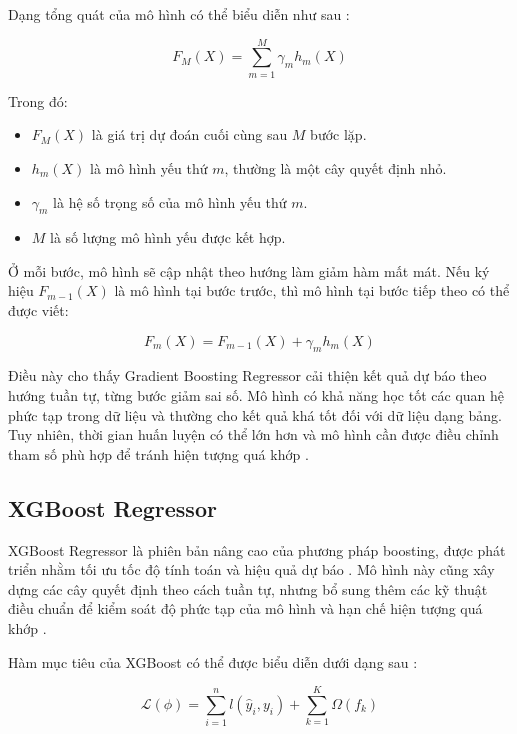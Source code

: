 Dạng tổng quát của mô hình có thể biểu diễn như sau \cite{sklearn_gbr,esl}:

\begin{equation}
F_M(X) = \sum_{m=1}^{M} \gamma_m h_m(X)
\label{eq:gbr1}
\end{equation}

Trong đó:
\begin{itemize}
    \item \(F_M(X)\) là giá trị dự đoán cuối cùng sau \(M\) bước lặp.
    \item \(h_m(X)\) là mô hình yếu thứ \(m\), thường là một cây quyết định nhỏ.
    \item \(\gamma_m\) là hệ số trọng số của mô hình yếu thứ \(m\).
    \item \(M\) là số lượng mô hình yếu được kết hợp.
\end{itemize}

Ở mỗi bước, mô hình sẽ cập nhật theo hướng làm giảm hàm mất mát. Nếu ký hiệu \(F_{m-1}(X)\) là mô hình tại bước trước, thì mô hình tại bước tiếp theo có thể được viết:

\begin{equation}
F_m(X) = F_{m-1}(X) + \gamma_m h_m(X)
\label{eq:gbr2}
\end{equation}

Điều này cho thấy Gradient Boosting Regressor cải thiện kết quả dự báo theo hướng tuần tự, từng bước giảm sai số. Mô hình có khả năng học tốt các quan hệ phức tạp trong dữ liệu và thường cho kết quả khá tốt đối với dữ liệu dạng bảng. Tuy nhiên, thời gian huấn luyện có thể lớn hơn và mô hình cần được điều chỉnh tham số phù hợp để tránh hiện tượng quá khớp \cite{sklearn_gbr,esl}.

\subsection*{\thesubsection\quad XGBoost Regressor}

XGBoost Regressor là phiên bản nâng cao của phương pháp boosting, được phát triển nhằm tối ưu tốc độ tính toán và hiệu quả dự báo \cite{chen2016xgboost}. Mô hình này cũng xây dựng các cây quyết định theo cách tuần tự, nhưng bổ sung thêm các kỹ thuật điều chuẩn để kiểm soát độ phức tạp của mô hình và hạn chế hiện tượng quá khớp \cite{chen2016xgboost}.

Hàm mục tiêu của XGBoost có thể được biểu diễn dưới dạng sau \cite{chen2016xgboost}:

\begin{equation}
\mathcal{L}(\phi) = \sum_{i=1}^{n} l(\hat{y}_i, y_i) + \sum_{k=1}^{K} \Omega(f_k)
\label{eq:xgb1}
\end{equation}

